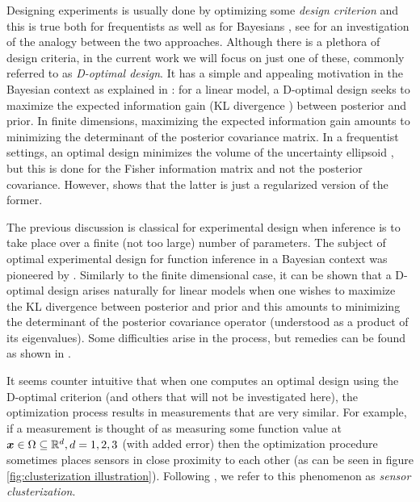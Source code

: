 \documentclass{amsart}
\numberwithin{equation}{section}
\begin{document}
Designing experiments is usually done by optimizing some \emph{design
  criterion} and this is true both for frequentists
\cite{Silvey13,Ucinski05} as well as for Bayesians
\cite{ChalonerVerdinelli95}, see \cite{ChalonerVerdinelli95} for an
investigation of the analogy between the two approaches. Although
there is a plethora of design criteria, in the current work we will
focus on just one of these, commonly referred to as \emph{D-optimal
  design}. It has a simple and appealing motivation in the Bayesian
context as explained in \cite{ChalonerVerdinelli95}: for a linear
model, a D-optimal design seeks to maximize the expected information
gain (KL divergence \cite{KullbackLeibler51,CoverThomas12}) between
posterior and prior. In finite dimensions, maximizing the expected
information gain amounts to minimizing the determinant of the
posterior covariance matrix. In a frequentist settings, an optimal
design minimizes the volume of the uncertainty ellipsoid \cite[page
  16]{Ucinski05}, but this is done for the Fisher information matrix
and not the posterior covariance. However, \cite{ChalonerVerdinelli95}
shows that the latter is just a regularized version of the former.

The previous discussion is classical for experimental design when
inference is to take place over a finite (not too large) number of
parameters. The subject of optimal experimental design for function
inference in a Bayesian context was pioneered by
\cite{AlexanderianGloorGhattas14,AlexanderianPetraStadlerEtAl16,
  AlexanderianPetraStadlerEtAl14}. Similarly to the finite dimensional
case, it can be shown that a D-optimal design arises naturally for
linear models when one wishes to maximize the KL divergence between
posterior and prior and this amounts to minimizing the determinant of
the posterior covariance operator (understood as a product of its
eigenvalues). Some difficulties arise in the process, but remedies can
be found as shown in \cite{AlexanderianGloorGhattas14}.

It seems counter intuitive that when one computes an optimal design
using the D-optimal criterion (and others that will not be
investigated here), the optimization process results in measurements
that are very similar. For example, if a measurement is thought of as
measuring some function value at ${\boldsymbol{x}} \in \Omega \subseteq \mathbb{R}^d,
d=1,2,3$ (with added error) then the optimization procedure sometimes
places sensors in close proximity to each other (as can be seen in
figure \ref{fig:clusterization illustration}). Following
\cite{Ucinski05}, we refer to this phenomenon as \emph{sensor
  clusterization}.
\end{document}

